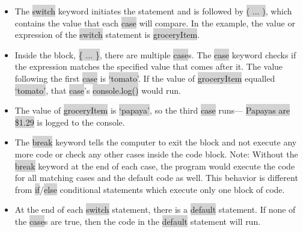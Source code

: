\documentclass[11pt]{article}
\begin{document}
\begin{itemize}[leftmargin = *]
\item The \colorbox{lightgray}{switch} keyword initiates the statement and is followed by \colorbox{lightgray}{( ... )}, which contains the value that each \colorbox{lightgray}{case} will compare. In the example, the value or expression of the \colorbox{lightgray}{switch} statement is \colorbox{lightgray}{groceryItem}.
\item Inside the block, \colorbox{lightgray}{\{ ... \}}, there are multiple \colorbox{lightgray}{case}s. The \colorbox{lightgray}{case} keyword checks if the expression matches the specified value that comes after it. The value following the first \colorbox{lightgray}{case} is \colorbox{lightgray}{`tomato'}. If the value of \colorbox{lightgray}{groceryItem} equalled \colorbox{lightgray}{`tomato'}, that \colorbox{lightgray}{case}'s \colorbox{lightgray}{console.log()} would run.
\item The value of \colorbox{lightgray}{groceryItem} is \colorbox{lightgray}{`papaya'}, so the third \colorbox{lightgray}{case} runs— \colorbox{lightgray}{Papayas are \$1.29} is logged to the console.
\item The \colorbox{lightgray}{break} keyword tells the computer to exit the block and not execute any more code or check any other cases inside the code block. Note: Without the \colorbox{lightgray}{break} keyword at the end of each case, the program would execute the code for all matching cases and the default code as well. This behavior is different from \colorbox{lightgray}{if}/\colorbox{lightgray}{else} conditional statements which execute only one block of code.
\item At the end of each \colorbox{lightgray}{switch} statement, there is a \colorbox{lightgray}{default} statement. If none of the \colorbox{lightgray}{case}s are true, then the code in the \colorbox{lightgray}{default} statement will run.
\end{itemize}
\end{document}

